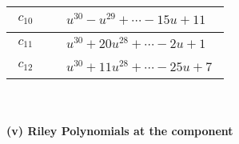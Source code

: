 \documentclass[1p]{elsarticle_modified}
\theoremstyle{definition}
\begin{document}
\begin{tabular}{m{50pt}|m{274pt}}
\hline $$\begin{aligned}c_{10}\end{aligned}$$&$\begin{aligned}
&u^{30}- u^{29}+\cdots-15 u+11
\end{aligned}$\\
\hline $$\begin{aligned}c_{11}\end{aligned}$$&$\begin{aligned}
&u^{30}+20 u^{28}+\cdots-2 u+1
\end{aligned}$\\
\hline $$\begin{aligned}c_{12}\end{aligned}$$&$\begin{aligned}
&u^{30}+11 u^{28}+\cdots-25 u+7
\end{aligned}$\\
\hline
\end{tabular}\\~\\
\newpage\renewcommand{\arraystretch}{1}
\flushleft \textbf{(v) Riley Polynomials at the component}\newline \\
\end{document}
